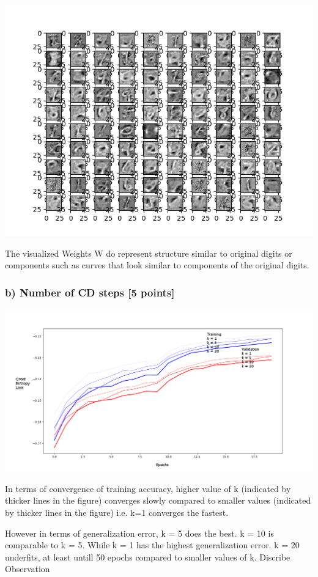 \documentclass[10pt]{article}
\begin{document}
\includegraphics[scale=0.7]{rbm_weights.png}

The visualized Weights W do represent structure similar to original digits or components such as curves that look similar to components of the original digits.

\subsubsection*{b) Number of CD steps [5 points]}

\includegraphics[scale=0.4]{rbm_k_experiment.png}

In terms of convergence of training accuracy, higher value of k (indicated by thicker lines in the figure) converges slowly compared to smaller values (indicated by thicker lines in the figure) i.e. k=1 converges the fastest.

However in terms of generalization error, k = 5 does the best. k = 10 is comparable to k = 5. While k = 1 has the highest generalization error. k = 20 underfits, at least untill 50 epochs compared to smaller values of k.
Discribe Observation
\end{document}
